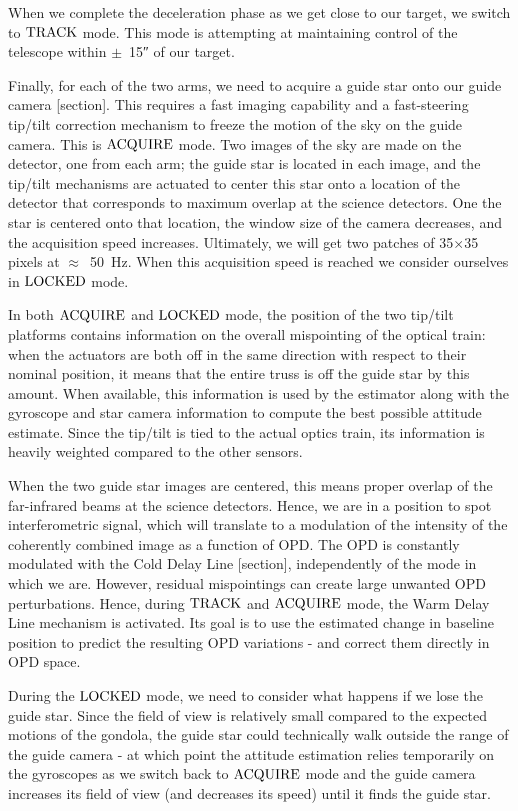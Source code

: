 When we complete the deceleration phase as we get close to our target, we switch to $\textrm{TRACK}$ mode. This mode is attempting at maintaining control of the telescope within $\pm$~\ang{;;15} of our target.

Finally, for each of the two arms, we need to acquire a guide star onto our guide camera [section]. This requires a fast imaging capability and a fast-steering tip/tilt correction mechanism to freeze the motion of the sky on the guide camera. This is $\textrm{ACQUIRE}$ mode. Two images of the sky are made on the detector, one from each arm; the guide star is located in each image, and the tip/tilt mechanisms are actuated to center this star onto a location of the detector that corresponds to maximum overlap at the science detectors. One the star is centered onto that location, the window size of the camera decreases, and the acquisition speed increases. Ultimately, we will get two patches of 35$\times$35 pixels at $\approx$~\SI{50}{\hertz}. When this acquisition speed is reached we consider ourselves in $\textrm{LOCKED}$ mode.

In both $\textrm{ACQUIRE}$ and $\textrm{LOCKED}$ mode, the position of the two tip/tilt platforms contains information on the overall mispointing of the optical train: when the actuators are both off in the same direction with respect to their nominal position, it means that the entire truss is off the guide star by this amount. When available, this information is used by the estimator along with the gyroscope and star camera information to compute the best possible attitude estimate. Since the tip/tilt is tied to the actual optics train, its information is heavily weighted compared to the other sensors. 

When the two guide star images are centered, this means proper overlap of the far-infrared beams at the science detectors. Hence, we are in a position to spot interferometric signal, which will translate to a modulation of the intensity of the coherently combined image as a function of OPD. The OPD is constantly modulated with the Cold Delay Line [section], independently of the mode in which we are. However, residual mispointings can create large unwanted OPD perturbations. Hence, during $\textrm{TRACK}$ and $\textrm{ACQUIRE}$ mode, the Warm Delay Line mechanism is activated. Its goal is to use the estimated change in baseline position to predict the resulting OPD variations - and correct them directly in OPD space. 

During the $\textrm{LOCKED}$ mode, we need to consider what happens if we lose the guide star. Since the field of view is relatively small compared to the expected motions of the gondola, the guide star could technically walk outside the range of the guide camera - at which point the attitude estimation relies temporarily on the gyroscopes as we switch back to $\textrm{ACQUIRE}$ mode and the guide camera increases its field of view (and decreases its speed) until it finds the guide star.

